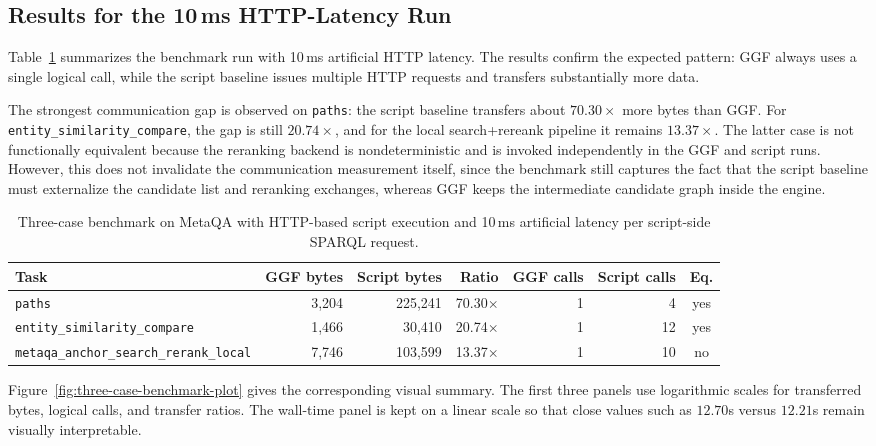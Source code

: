 \subsection{Results for the 10\,ms HTTP-Latency Run}
\label{subsec:results-10ms}

Table~\ref{tab:three-case-benchmark-results} summarizes the benchmark run with
10\,ms artificial HTTP latency. The results confirm the expected pattern:
GGF always uses a single logical call, while the script baseline issues
multiple HTTP requests and transfers substantially more data.

The strongest communication gap is observed on \texttt{paths}: the script
baseline transfers about \(70.30\times\) more bytes than GGF. For
\texttt{entity\_similarity\_compare}, the gap is still \(20.74\times\), and
for the local search+rereank pipeline it remains \(13.37\times\). The latter
case is not functionally equivalent because the reranking backend is
nondeterministic and is invoked independently in the GGF and script runs.
However, this does not invalidate the communication measurement itself, since
the benchmark still captures the fact that the script baseline must externalize
the candidate list and reranking exchanges, whereas GGF keeps the intermediate
candidate graph inside the engine.

\begin{table}[t]
\centering
\small
\begin{tabular}{l|r|r|r|r|r|c}
\hline
Task & GGF bytes & Script bytes & Ratio & GGF calls & Script calls & Eq. \\
\hline
\texttt{paths} & 3,204 & 225,241 & 70.30$\times$ & 1 & 4 & yes \\
\texttt{entity\_similarity\_compare} & 1,466 & 30,410 & 20.74$\times$ & 1 & 12 & yes \\
\texttt{metaqa\_anchor\_search\_rerank\_local} & 7,746 & 103,599 & 13.37$\times$ & 1 & 10 & no \\
\hline
\end{tabular}
\caption{Three-case benchmark on MetaQA with HTTP-based script execution and
10\,ms artificial latency per script-side SPARQL request.}
\label{tab:three-case-benchmark-results}
\end{table}

Figure~\ref{fig:three-case-benchmark-plot} gives the corresponding visual
summary. The first three panels use logarithmic scales for transferred bytes,
logical calls, and transfer ratios. The wall-time panel is kept on a linear
scale so that close values such as \(12.70\)s versus \(12.21\)s remain visually
interpretable.

